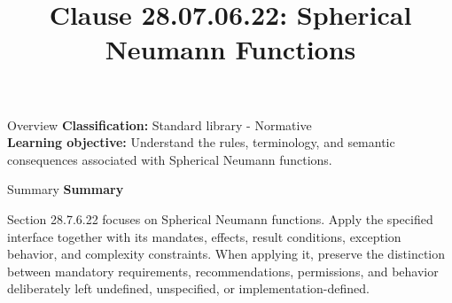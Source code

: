 \documentclass[10pt,letterpaper]{article}
\title{Clause 28.07.06.22: Spherical Neumann Functions}
\author{}
\date{}
\begin{document}
\maketitle
\begin{CornellOverviewBox}{Overview}
\textbf{Classification:} Standard library - Normative\\[2pt]
\textbf{Learning objective:} Understand the rules, terminology, and semantic consequences associated with Spherical Neumann functions.
\end{CornellOverviewBox}\begin{CornellSummaryBox}{Summary}
{\sffamily\bfseries\color{Accent} Summary}\par\vspace{3pt}Section 28.7.6.22 focuses on Spherical Neumann functions. Apply the specified interface together with its mandates, effects, result conditions, exception behavior, and complexity constraints. When applying it, preserve the distinction between mandatory requirements, recommendations, permissions, and behavior deliberately left undefined, unspecified, or implementation-defined.
\end{CornellSummaryBox}
\end{document}
